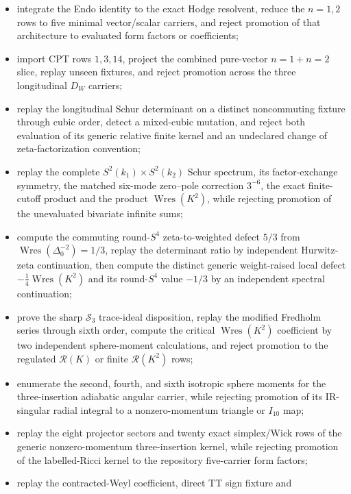 \documentclass[11pt]{article}
\theoremstyle{definition}
\theoremstyle{remark}
\begin{document}
\begin{itemize}
nonzero-mode determinant identity and cubic Duhamel insertion bound, while
rejecting promotion of the unevaluated insertion traces;
\item integrate the Endo identity to the exact Hodge resolvent, reduce the
$n=1,2$ rows to five minimal vector/scalar carriers, and reject promotion of
that architecture to evaluated form factors or coefficients;
\item import CPT rows $1,3,14$, project the combined pure-vector $n=1+n=2$
slice, replay unseen fixtures, and reject promotion across the three
longitudinal $D_W$ carriers;
\item replay the longitudinal Schur determinant on a distinct noncommuting
fixture through cubic order, detect a mixed-cubic mutation, and reject both
evaluation of its generic relative finite kernel and an undeclared change of
zeta-factorization convention;
\item replay the complete $S^2(k_1)\times S^2(k_2)$ Schur spectrum, its
factor-exchange symmetry, the matched six-mode zero--pole correction $3^{-6}$,
the exact finite-cutoff product and the product $\operatorname{Wres}(K^2)$,
while rejecting promotion of the unevaluated bivariate infinite sums;
\item compute the commuting round-$S^4$ zeta-to-weighted defect $5/3$ from
$\operatorname{Wres}(\Delta_0^{-2})=1/3$, replay the determinant ratio by
independent Hurwitz-zeta continuation, then compute the distinct generic
weight-raised local defect $-\tfrac14\operatorname{Wres}(K^2)$ and its
round-$S^4$ value $-1/3$ by an independent spectral continuation;
\item prove the sharp $\mathcal S_3$ trace-ideal disposition, replay the
modified Fredholm series through sixth order, compute the critical
$\operatorname{Wres}(K^2)$ coefficient by two independent sphere-moment
calculations, and reject promotion to the regulated $\mathcal R(K)$ or finite
$\mathcal R(K^2)$ rows;
\item enumerate the second, fourth, and sixth isotropic sphere moments for the
three-insertion adiabatic angular carrier, while rejecting promotion of its
IR-singular radial integral to a nonzero-momentum triangle or $I_{10}$ map;
\item replay the eight projector sectors and twenty exact simplex/Wick rows
of the generic nonzero-momentum three-insertion kernel, while rejecting
promotion of the labelled-Ricci kernel to the repository five-carrier form
factors;
\item replay the contracted-Weyl coefficient, direct TT sign fixture and

\end{itemize}
\end{document}
